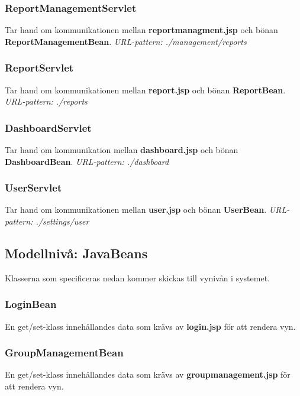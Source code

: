 \documentclass[paper=a4, fontsize=11pt,twoside]{article}
\begin{document}
\subsubsection{ReportManagementServlet}
Tar hand om kommunikationen mellan \textbf{reportmanagment.jsp} och bönan \textbf{ReportManagementBean}.\newline
\newline
\textit{URL-pattern: ./management/reports}

\subsubsection{ ReportServlet}
Tar hand om kommunikationen mellan \textbf{report.jsp} och bönan \textbf{ReportBean}. \newline
\newline
\textit{URL-pattern: ./reports}

\subsubsection{DashboardServlet}
Tar hand om kommunikation mellan \textbf{dashboard.jsp} och bönan \textbf{DashboardBean}.\newline
\newline
\textit{URL-pattern: ./dashboard}

\subsubsection{UserServlet}
Tar hand om kommunikationen mellan \textbf{user.jsp} och bönan \textbf{UserBean}.\newline
\newline
\textit{URL-pattern: ./settings/user}

\subsection{Modellnivå: JavaBeans}
Klasserna som specificeras nedan kommer skickas till vynivån i systemet.

\subsubsection{LoginBean}
En get/set-klass innehållandes data som krävs av \textbf{login.jsp} för att rendera vyn.

\subsubsection{GroupManagementBean}
En get/set-klass innehållandes data som krävs av \textbf{groupmanagement.jsp} för att rendera vyn.
\end{document}
